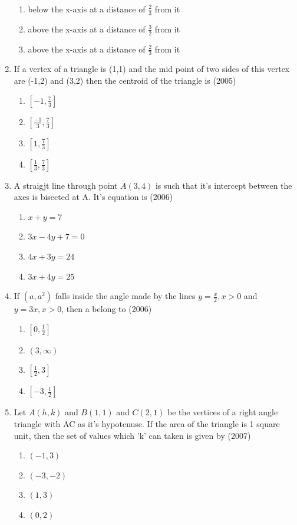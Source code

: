 \documentclass[12pt]{article}
\begin{document}
\begin{enumerate}
\begin{enumerate}
\item below the x-axis at a distance of $\frac{2}{3}$ from it
\item above the x-axis at a distance of $\frac{3}{2}$ from it
\item above the x-axis at a distance of $\frac{2}{3}$ from it
\end{enumerate}
\item If a vertex of a triangle is (1,1) and the mid point of two sides of this vertex are (-1,2) and (3,2) then the centroid of the triangle is (2005)
\begin{enumerate}
\item $\left[-1,\frac{7}{3}\right]$ 
\item $\left[ \frac{-1}{3},\frac{7}{3}\right]$ 
\item $\left[1,\frac{7}{3}\right]$  
\item $\left[ \frac{1}{3},\frac{7}{3}\right]$ 
\end{enumerate}
\item A straigjt line through point $A(3,4)$ is such that it's intercept between the axes is bisected at A. It's equation is (2006)
\begin{enumerate}
\item $x+y=7$ 
\item $3x-4y+7=0$  
\item $4x+3y=24$ 
\item $3x+4y=25$
\end{enumerate}
\item If $(a,a^2)$ falls inside the angle made by the lines $y= \frac{x}{2}, x>0$ and $y=3x, x>0$, then a belong to (2006)
\begin{enumerate}
\item $\left[ 0,\frac{1}{2}\right]$ 
\item $(3,\infty)$ 
\item $\left[\frac{1}{2},3\right]$ 
\item $\left[-3,\frac{1}{2}\right]$
\end{enumerate}
\item Let $A(h,k)$ and $B(1,1)$ and $C(2,1)$ be the vertices of a right angle triangle with AC as it's hypotenuse. If the area of the triangle is 1 square unit, then the set of values which 'k' can taken is given by (2007)
\begin{enumerate}
\item $(-1,3)$ 
\item $(-3,-2)$
\item $(1,3)$ 
\item $(0,2)$

\end{enumerate}
\end{enumerate}
\end{document}
